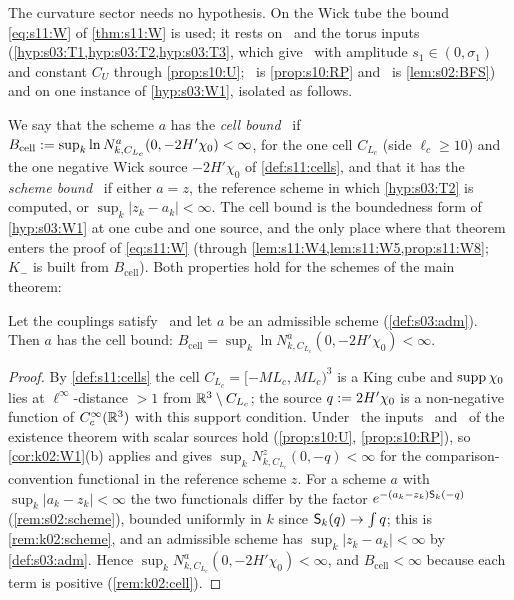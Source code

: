 The curvature sector needs no hypothesis. On the Wick tube the bound \eqref{eq:s11:W} of \cref{thm:s11:W} is used; it rests on \Tthree\ and the torus inputs (\cref{hyp:s03:T1,hyp:s03:T2,hyp:s03:T3}, which give \Itwo\ with amplitude $s_1\in(0,\sigma_1)$ and constant $C_U$ through \cref{prop:s10:U}; \Ithree\ is \cref{prop:s10:RP} and \Ifour\ is \cref{lem:s02:BFS}) and on one instance of \cref{hyp:s03:W1}, isolated as follows.

We say that the scheme $a$ has the \emph{cell bound} \Bcell\ if $B_{\mathrm{cell}}:=\sup_k\ln N^a_{k,C_{L_c}}(0,-2H'\chi_0)<\infty$, for the one cell $C_{L_c}$ (side $\ell_c\ge10$) and the one negative Wick source $-2H'\chi_0$ of \cref{def:s11:cells}, and that it has the \emph{scheme bound} \SCH\ if either $a=z$, the reference scheme in which \cref{hyp:s03:T2} is computed, or $\sup_k|z_k-a_k|<\infty$. The cell bound is the boundedness form of \cref{hyp:s03:W1} at one cube and one source, and the only place where that theorem enters the proof of \eqref{eq:s11:W} (through \cref{lem:s11:W4,lem:s11:W5,prop:s11:W8}; $K_-$ is built from $B_{\mathrm{cell}}$). Both properties hold for the schemes of the main theorem:

\begin{lemma}\label{hyp:s12:Bcell}
Let the couplings satisfy \Tthree\ and let $a$ be an admissible scheme (\cref{def:s03:adm}). Then $a$ has the cell bound: $B_{\mathrm{cell}}=\sup_k\ln N^a_{k,C_{L_c}}(0,-2H'\chi_0)<\infty$.
\end{lemma}

\begin{proof}
By \cref{def:s11:cells} the cell $C_{L_c}=[-ML_c,ML_c)^3$ is a King cube and $\operatorname{supp}\chi_0$ lies at $\ell^\infty$-distance $>1$ from $\mathbb R^3\setminus C_{L_c}$; the source $q:=2H'\chi_0$ is a non-negative function of $C^\infty_c(\mathbb R^3)$ with this support condition. Under \Tthree\ the inputs \Itwo\ and \Ithree\ of the existence theorem with scalar sources hold (\cref{prop:s10:U}, \cref{prop:s10:RP}), so \cref{cor:k02:W1}(b) applies and gives $\sup_kN^z_{k,C_{L_c}}(0,-q)<\infty$ for the comparison-convention functional in the reference scheme $z$. For a scheme $a$ with $\sup_k|a_k-z_k|<\infty$ the two functionals differ by the factor $e^{-(a_k-z_k)\mathsf S_k(-q)}$ (\cref{rem:s02:scheme}), bounded uniformly in $k$ since $\mathsf S_k(q)\to\int q$; this is \cref{rem:k02:scheme}, and an admissible scheme has $\sup_k|z_k-a_k|<\infty$ by \cref{def:s03:adm}. Hence $\sup_kN^a_{k,C_{L_c}}(0,-2H'\chi_0)<\infty$, and $B_{\mathrm{cell}}<\infty$ because each term is positive (\cref{rem:k02:cell}).
\end{proof}

